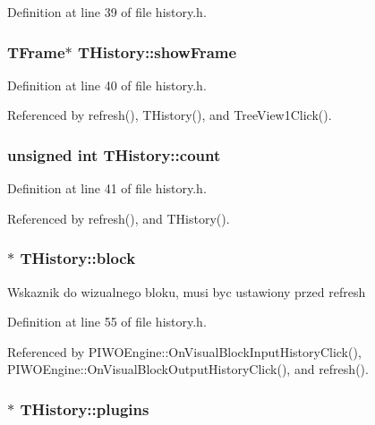 Definition at line 39 of file history.h.\hypertarget{classTHistory_bd6410d2b6668ee021fe128e6b7cc874}{
\subsubsection[showFrame]{\setlength{\rightskip}{0pt plus 5cm}TFrame$\ast$ {\bf THistory::showFrame}}}
\label{classTHistory_bd6410d2b6668ee021fe128e6b7cc874}




Definition at line 40 of file history.h.

Referenced by refresh(), THistory(), and TreeView1Click().\hypertarget{classTHistory_716bcd58a7ba40e8003454d811a64cd0}{
\subsubsection[count]{\setlength{\rightskip}{0pt plus 5cm}unsigned int {\bf THistory::count}}}
\label{classTHistory_716bcd58a7ba40e8003454d811a64cd0}




Definition at line 41 of file history.h.

Referenced by refresh(), and THistory().\hypertarget{classTHistory_f4c969766311242d1c6d66cd9b126356}{
\subsubsection[block]{$\ast$ {\bf THistory::block}}}
\label{classTHistory_f4c969766311242d1c6d66cd9b126356}


Wskaznik do wizualnego bloku, musi byc ustawiony przed refresh 

Definition at line 55 of file history.h.

Referenced by PIWOEngine::OnVisualBlockInputHistoryClick(), PIWOEngine::OnVisualBlockOutputHistoryClick(), and refresh().\hypertarget{classTHistory_c2d0ea83df40a55b1c899bd87af9652f}{
\subsubsection[plugins]{$\ast$ {\bf THistory::plugins}}}
\label{classTHistory_c2d0ea83df40a55b1c899bd87af9652f}


